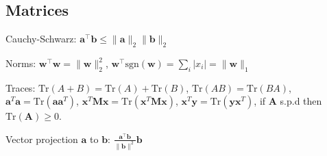 \subsection*{Matrices}

Cauchy-Schwarz: $\mathbf a^\top\mathbf b \leq \|\mathbf a\|_2\|\mathbf b\|_2$

Norms: $\mathbf w^\top\mathbf w=\|\mathbf w\|_2^2$, $\mathbf w^\top\text{sgn}(\mathbf w)=\sum_i |x_i|=\|\mathbf w \|_1$

Traces: $\text{Tr}(A+B)=\text{Tr}(A)+\text{Tr}(B)$, $\text{Tr}(AB)=\text{Tr}(BA)$, $\mathbf{a}^T \mathbf a = \text{Tr}(\mathbf{aa}^T)$, $\mathbf x^T\mathbf M\mathbf x=\text{Tr}(\mathbf x^T\mathbf M\mathbf x)$, $\mathbf x^T\mathbf y = \text{Tr}(\mathbf{yx}^T)$, if $\mathbf A$ s.p.d then $\text{Tr}(\mathbf A)\geq 0$.

Vector projection $\mathbf a$ to $\mathbf b$: $\frac{\mathbf a^\top \mathbf b}{\|\mathbf b\|^2}\mathbf b$

